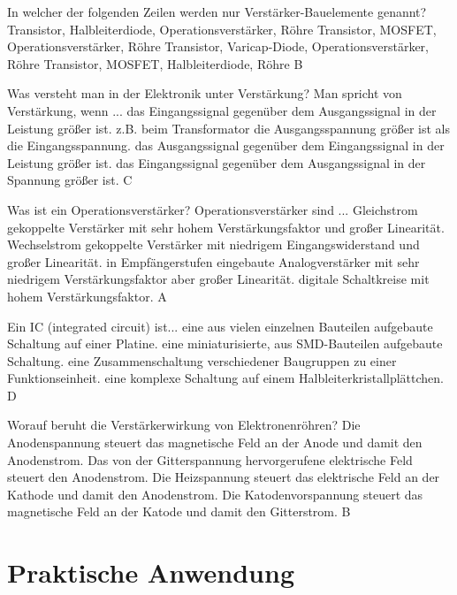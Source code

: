 {In welcher der folgenden Zeilen werden nur Verstärker-Bauelemente genannt?}%
{Transistor, Halbleiterdiode, Operationsverstärker, Röhre}%
{Transistor, MOSFET, Operationsverstärker, Röhre}%
{Transistor, Varicap-Diode, Operationsverstärker, Röhre}%
{Transistor, MOSFET, Halbleiterdiode, Röhre}%
{B}%

{Was versteht man in der Elektronik unter Verstärkung? Man spricht von Verstärkung, wenn ...}%
{das Eingangssignal gegenüber dem Ausgangssignal in der Leistung größer ist.}%
{z.B. beim Transformator die Ausgangsspannung größer ist als die Eingangsspannung.}%
{das Ausgangssignal gegenüber dem Eingangssignal in der Leistung größer ist.}%
{das Eingangssignal gegenüber dem Ausgangssignal in der Spannung größer ist.}%
{C}%

{Was ist ein Operationsverstärker? Operationsverstärker sind ...}%
{Gleichstrom gekoppelte Verstärker mit sehr hohem Verstärkungsfaktor und großer Linearität.}%
{Wechselstrom gekoppelte Verstärker mit niedrigem Eingangswiderstand und großer Linearität.}%
{in Empfängerstufen eingebaute Analogverstärker mit sehr niedrigem Verstärkungsfaktor aber großer Linearität.}%
{digitale Schaltkreise mit hohem Verstärkungsfaktor.}%
{A}%

{ Ein IC (integrated circuit) ist...}%
{eine aus vielen einzelnen Bauteilen aufgebaute Schaltung auf einer Platine.}%
{eine miniaturisierte, aus SMD-Bauteilen aufgebaute Schaltung.}%
{eine Zusammenschaltung verschiedener Baugruppen zu einer Funktionseinheit.}%
{eine komplexe Schaltung auf einem Halbleiterkristallplättchen.}%
{D}%

{Worauf beruht die Verstärkerwirkung von Elektronenröhren?}%
{Die Anodenspannung steuert das magnetische Feld an der Anode und damit den Anodenstrom.}%
{Das von der Gitterspannung hervorgerufene elektrische Feld steuert den Anodenstrom.}%
{Die Heizspannung steuert das elektrische Feld an der Kathode und damit den Anodenstrom.}%
{Die Katodenvorspannung steuert das magnetische Feld an der Katode und damit den Gitterstrom.}%
{B}%

\newpage

\section*{Praktische Anwendung}


